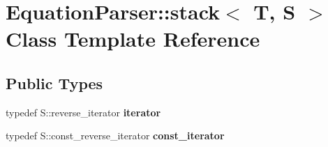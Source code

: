 \hypertarget{classEquationParser_1_1stack}{}\section{Equation\+Parser\+:\+:stack$<$ T, S $>$ Class Template Reference}
\label{classEquationParser_1_1stack}
\subsection*{Public Types}
\begin{DoxyCompactItemize}
\item 
typedef S\+::reverse\+\_\+iterator {\bfseries iterator}\hypertarget{classEquationParser_1_1stack_a4787206121915f47e3424ffc40905c83}{}\label{classEquationParser_1_1stack_a4787206121915f47e3424ffc40905c83}

\item 
typedef S\+::const\+\_\+reverse\+\_\+iterator {\bfseries const\+\_\+iterator}\hypertarget{classEquationParser_1_1stack_a9345af7f2b8beffb48a2d402aaf1dd0e}{}\label{classEquationParser_1_1stack_a9345af7f2b8beffb48a2d402aaf1dd0e}

\end{DoxyCompactItemize}
